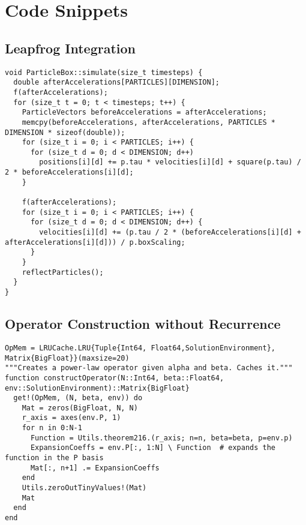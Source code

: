 
\chapter{Code Snippets}
\label{appendix:code-snippets}

\section{Leapfrog Integration}
\begin{verbatim}
void ParticleBox::simulate(size_t timesteps) {
  double afterAccelerations[PARTICLES][DIMENSION];
  f(afterAccelerations);
  for (size_t t = 0; t < timesteps; t++) {
    ParticleVectors beforeAccelerations = afterAccelerations;
    memcpy(beforeAccelerations, afterAccelerations, PARTICLES * DIMENSION * sizeof(double));
    for (size_t i = 0; i < PARTICLES; i++) {
      for (size_t d = 0; d < DIMENSION; d++)
        positions[i][d] += p.tau * velocities[i][d] + square(p.tau) / 2 * beforeAccelerations[i][d];
    }

    f(afterAccelerations);
    for (size_t i = 0; i < PARTICLES; i++) {
      for (size_t d = 0; d < DIMENSION; d++) {
        velocities[i][d] += (p.tau / 2 * (beforeAccelerations[i][d] + afterAccelerations[i][d])) / p.boxScaling;
      }
    }
    reflectParticles();
  }
}
\end{verbatim}

\pagebreak
\section{Operator Construction without Recurrence}
\begin{verbatim}
OpMem = LRUCache.LRU{Tuple{Int64, Float64,SolutionEnvironment}, Matrix{BigFloat}}(maxsize=20)
"""Creates a power-law operator given alpha and beta. Caches it."""
function constructOperator(N::Int64, beta::Float64, env::SolutionEnvironment)::Matrix{BigFloat}
  get!(OpMem, (N, beta, env)) do
    Mat = zeros(BigFloat, N, N)
    r_axis = axes(env.P, 1)
    for n in 0:N-1
      Function = Utils.theorem216.(r_axis; n=n, beta=beta, p=env.p)
      ExpansionCoeffs = env.P[:, 1:N] \ Function  # expands the function in the P basis
      Mat[:, n+1] .= ExpansionCoeffs
    end
    Utils.zeroOutTinyValues!(Mat)
    Mat
  end
end
\end{verbatim}
